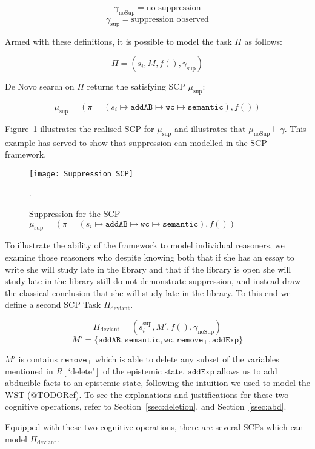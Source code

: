\[\gamma_{\text{noSup}} = \text{no suppression} \]
\[\gamma_{\text{sup}} = \text{suppression observed} \]

Armed with these definitions, it is possible to model the task $\Pi$ as follows:

\[\Pi=(s_i,M,f(),\gamma_{\text{sup}})\]

De Novo search on $\Pi$ returns the satisfying SCP $\mu_\text{sup}$:

\[\mu_\text{sup}=(\pi=(s_i \longmapsto \texttt{addAB} \longmapsto \texttt{wc} \longmapsto \texttt{semantic}),f())\]

Figure~\ref{fig:Suppression_SCP} illustrates the realised SCP for $\mu_\text{sup}$ and illustrates that $\mu_\text{noSup} \models \gamma$. This example has served to show that suppression can modelled in the SCP framework.

\begin{figure}
\centering \texttt{[image: Suppression\_SCP]}
\caption{Suppression for the SCP $\mu_\text{sup}=(\pi=(s_i \longmapsto \texttt{addAB} \longmapsto \texttt{wc} \longmapsto \texttt{semantic}),f())$}.
\label{fig:Suppression_SCP}
\end{figure}


To illustrate the ability of the framework to model individual reasoners, we examine those reasoners who despite knowing both that if she has an essay to write she will study late in the library and that if the library is open she will study late in the library still do not demonstrate suppression, and instead draw the classical conclusion that she will study late in the library. To this end we define a second SCP Task $\Pi_\text{deviant}$.

\[\Pi_\text{deviant}=(s_i^{\text{sup}},M',f(),\gamma_{\text{noSup}})\]
\[M'=\{\texttt{addAB}, \texttt{semantic}, \texttt{wc}, \texttt{remove}_\bot, \texttt{addExp}\}\]

$M'$ is contains $\texttt{remove}_\bot$ which is able to delete any subset of the variables mentioned in $R[\text{`delete'}]$ of the epistemic state. $\texttt{addExp}$ allows us to add abducible facts to an epistemic state, following the intuition we used to model the WST (@TODORef). To see the explanations and justifications for these two cognitive operations, refer to Section~\ref{ssec:deletion}, and Section~\ref{ssec:abd}.

Equipped with these two cognitive operations, there are several SCPs which can model $\Pi_\text{deviant}$.

